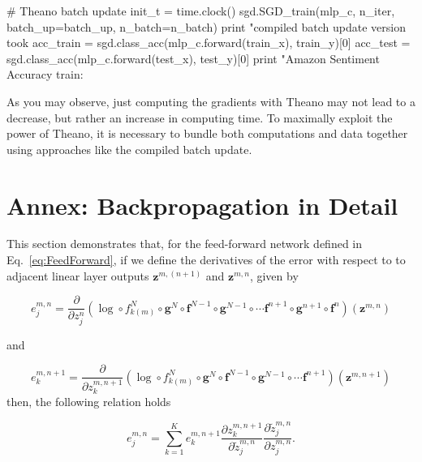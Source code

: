 \begin{exercise}
\begin{python}
# Theano batch update
init_t = time.clock()
sgd.SGD_train(mlp_c, n_iter, batch_up=batch_up, n_batch=n_batch)
print "\nTheano compiled batch update version took %
acc_train = sgd.class_acc(mlp_c.forward(train_x), train_y)[0]
acc_test  = sgd.class_acc(mlp_c.forward(test_x), test_y)[0]
print "Amazon Sentiment Accuracy train: %
\end{python}
As you may observe, just computing the gradients with Theano may not lead to
a decrease, but rather an increase in computing time. To maximally exploit
the power of Theano, it is necessary to bundle both computations and data 
together using approaches like the compiled batch update.
\end{exercise}

\section*{Annex: Backpropagation in Detail}

This section demonstrates that, for the feed-forward
network defined in Eq.~\ref{eq:FeedForward}, if we define the derivatives of
the error with respect to to adjacent linear layer outputs
$\mathbf{z}^{m,(n+1)}$ and $\mathbf{z}^{m,n}$, given by

\begin{equation}
e^{m,n}_j = \frac{\partial}{\partial z^{n}_{j}} (\log \circ f_{k(m)}^N \circ \mathbf{g}^N \circ \mathbf{f}^{N-1} \circ \mathbf{g}^{N-1} \circ \cdots \mathbf{f}^{n+1} \circ \mathbf{g}^{n+1} \circ \mathbf{f}^{n})(\mathbf{z}^{m,n}) 
\label{eq:endetail}
\end{equation}

\noindent and 

\begin{equation}
e^{m,n+1}_k = \frac{\partial}{\partial z^{m,n+1}_{k}} (\log \circ f_{k(m)}^N \circ \mathbf{g}^N \circ \mathbf{f}^{N-1} \circ \mathbf{g}^{N-1} \circ \cdots \mathbf{f}^{n+1})(\mathbf{z}^{m,n+1})
\label{eq:enp1detail}
\end{equation}
%
\noindent then,
 the following relation holds

\begin{equation}
e^{m,n}_j = \sum_{k=1}^K e^{m,n+1}_k \frac{\partial z^{m,n+1}_k}{\partial \tilde{z}_{j}^{m,n}}\frac{\partial \tilde{z}^{m,n}_{j}}{\partial z_{j}^{m,n}}.
\label{eq:DetailchainRulRecursion}
\end{equation}

